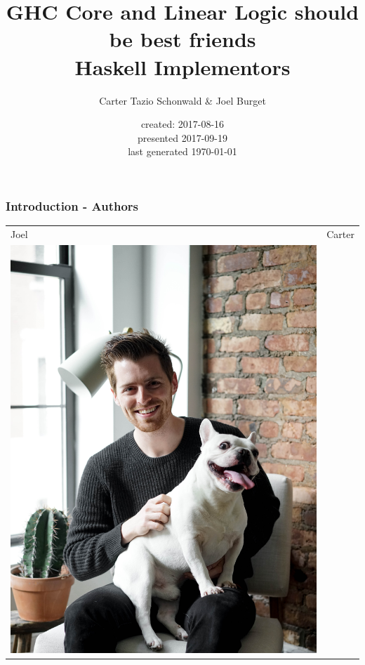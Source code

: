 \documentclass[11pt,reqno]{beamer}
\newcommand{\now}{\fullisodate
  \today  \usdate}
\begin{document}
\title{GHC Core and Linear Logic should be best friends \\ Haskell Implementors}
\author{Carter Tazio Schonwald \& Joel Burget}
\date{created: 2017-08-16\\ presented 2017-09-19 \\ last generated \now}

\maketitle

\begin{frame}
  \frametitle{Introduction - Authors}

\begin{centering}
\begin{tabular}{l|r}
Joel & Carter  \\
  \includegraphics[scale=0.06]{../joelpics/joel.jpg}   &

\end{tabular}
\end{centering}
\end{frame}
\end{document}
